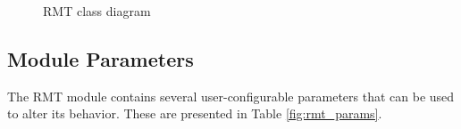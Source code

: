             \begin{figure}[H]
                \begin{center}
                  \caption{RMT class diagram}
                  \label{fig:rinasim:rmt-erd}
                \end{center}
            \end{figure}

        \subsection{Module Parameters}
            The RMT module contains several user-configurable parameters that can be used to alter its behavior. These are presented in Table \ref{fig:rmt_params}.

